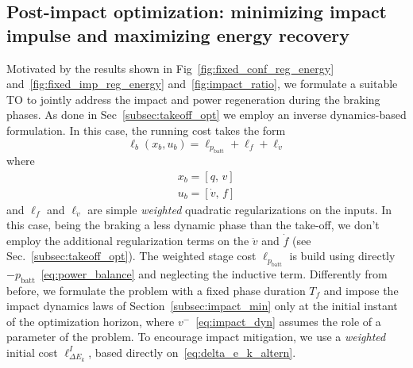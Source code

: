 \subsection{Post-impact optimization: minimizing impact impulse and maximizing energy recovery}\label{subsec:energy_rec_opt}
Motivated by the results shown in Fig~\ref{fig:fixed_conf_reg_energy} and~\ref{fig:fixed_imp_reg_energy} and~\ref{fig:impact_ratio}, we formulate a suitable TO to jointly address the impact and power regeneration during the braking phases. As done in Sec~\ref{subsec:takeoff_opt} we employ an inverse dynamics-based formulation. In this case, the running cost takes the form
\begin{dmath}\label{eq:takeoff_running_cost_braking}
    \ell_{b}(x_b, u_b) = \ell_{p_{\mathrm{batt}}} + \ell_f + \ell_{\dot{v}}
\end{dmath}
where\vspace{-0.5cm}
\begin{eqnarray}
    x_b = \left[q,\,v\right]\\
    u_b = \left[\dot{v},\,f\right]
\end{eqnarray}
and $\ell_f$ and $\ell_{\dot{v}}$ are simple \textit{weighted} quadratic regularizations on the inputs. In this case, being the braking a less dynamic phase than the take-off, we don't employ the additional regularization terms on the $\ddot{v}$ and $\dot{f}$ (see Sec.~\ref{subsec:takeoff_opt}). The weighted stage cost $\ell_{p_{\mathrm{batt}}}$ is build using directly $- p_{\mathrm{batt}}$~\eqref{eq:power_balance} and neglecting the inductive term. 
Differently from before, we formulate the problem with a fixed phase duration $T_f$ and impose the impact dynamics laws of Section~\ref{subsec:impact_min} only at the initial instant of the optimization horizon, where $v^{-}$~\eqref{eq:impact_dyn} assumes the role of a parameter of the problem. To encourage impact mitigation, we use a \textit{weighted} initial cost $\ell_{\Delta E_k}^{I}$, based directly on~\eqref{eq:delta_e_k_altern}. 
